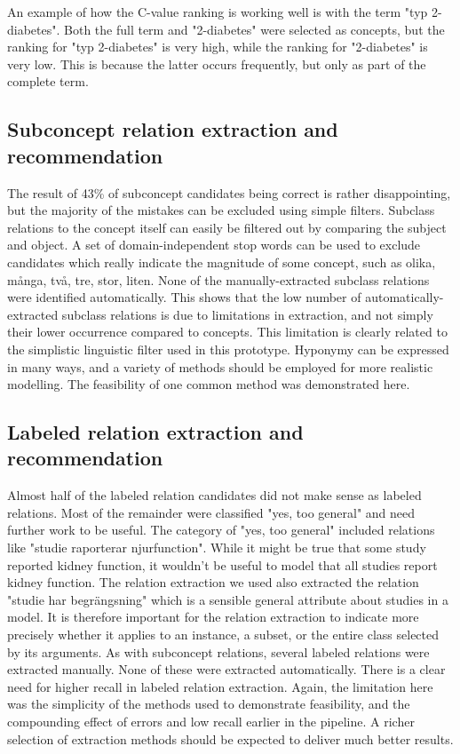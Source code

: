 \documentclass[a4paper]{report}
\begin{document}
An example of how the C-value ranking is working well is with the term "typ 2-diabetes". Both the full term and "2-diabetes" were selected as concepts, but the ranking for "typ 2-diabetes" is very high, while the ranking for "2-diabetes" is very low. This is because the latter occurs frequently, but only as part of the complete term.

\subsection{Subconcept relation extraction and recommendation}

The result of 43\% of subconcept candidates being correct is rather disappointing, but the majority of the mistakes can be excluded using simple filters.
Subclass relations to the concept itself can easily be filtered out by comparing the subject and object.
A set of domain-independent stop words can be used to exclude candidates which really indicate the magnitude of some concept, such as olika, många, två, tre, stor, liten.
None of the manually-extracted subclass relations were identified automatically.
This shows that the low number of automatically-extracted subclass relations is due to limitations in extraction, and not simply their lower occurrence compared to concepts.
This limitation is clearly related to the simplistic linguistic filter used in this prototype.
Hyponymy can be expressed in many ways, and a variety of methods should be employed for more realistic modelling.
The feasibility of one common method was demonstrated here.

\subsection{Labeled relation extraction and recommendation}

Almost half of the labeled relation candidates did not make sense as labeled relations.
Most of the remainder were classified "yes, too general" and need further work to be useful.
The category of "yes, too general" included relations like "studie raporterar njurfunction".
While it might be true that some study reported kidney function, it wouldn't be useful to model that all studies report kidney function.
The relation extraction we used also extracted the relation "studie har begrängsning" which is a sensible general attribute about studies in a model.
It is therefore important for the relation extraction to indicate more precisely whether it applies to an instance, a subset, or the entire class selected by its arguments.
As with subconcept relations, several labeled relations were extracted manually.
None of these were extracted automatically.
There is a clear need for higher recall in labeled relation extraction.
Again, the limitation here was the simplicity of the methods used to demonstrate feasibility, and the compounding effect of errors and low recall earlier in the pipeline.
A richer selection of extraction methods should be expected to deliver much better results.
\end{document}
